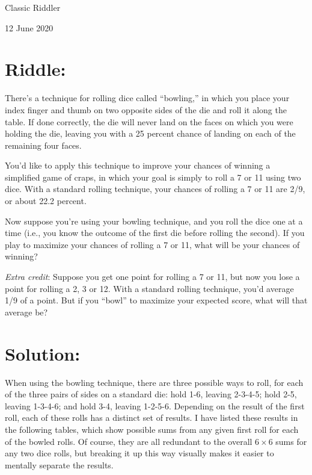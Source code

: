 \documentclass{article}
\begin{document}
\pagestyle{empty} %

\begin{center}
{\LARGE Classic Riddler}

\vspace{0.15in}

{\Large 12 June 2020}
\end{center}


\section*{Riddle:}

There's a technique for rolling dice called ``bowling,'' in which you place your index finger and thumb on two opposite sides of the die and roll it along the table.
If done correctly, the die will never land on the faces on which you were holding the die, leaving you with a 25 percent chance of landing on each of the remaining four faces.

You'd like to apply this technique to improve your chances of winning a simplified game of craps, in which your goal is simply to roll a 7 or 11 using two dice.
With a standard rolling technique, your chances of rolling a 7 or 11 are 2/9, or about 22.2 percent.

Now suppose you're using your bowling technique, and you roll the dice one at a time (i.e., you know the outcome of the first die before rolling the second).
If you play to maximize your chances of rolling a 7 or 11, what will be your chances of winning?

\textit{Extra credit}: Suppose you get one point for rolling a 7 or 11, but now you lose a point for rolling a 2, 3 or 12. With a standard rolling technique, you'd average 1/9 of a point. But if you ``bowl'' to maximize your expected score, what will that average be?

\section*{Solution:}

When using the bowling technique, there are three possible ways to roll, for each of the three pairs of sides on a standard die: hold 1-6, leaving 2-3-4-5; hold 2-5, leaving 1-3-4-6; and hold 3-4, leaving 1-2-5-6.
Depending on the result of the first roll, each of these rolls has a distinct set of results.
I have listed these results in the following tables, which show possible sums from any given first roll for each of the bowled rolls.
Of course, they are all redundant to the overall $6\times6$ sums for any two dice rolls, but breaking it up this way visually makes it easier to mentally separate the results.
\end{document}
